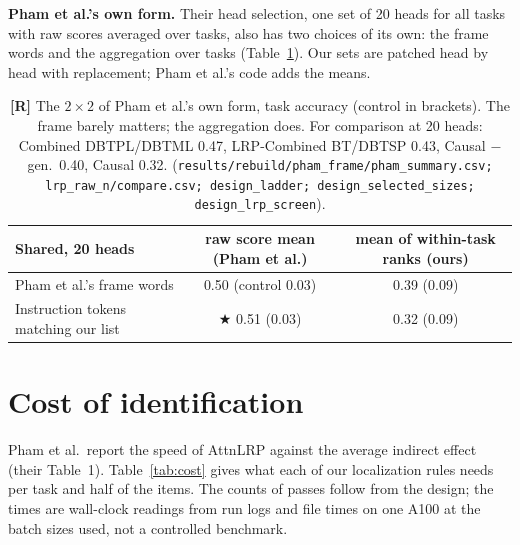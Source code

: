 \documentclass[10pt,a4paper]{article}
\newcommand{\best}{\textcolor{blue!65!black}{$\bigstar$}}
\newcommand{\tR}{\textsf{\textbf{[R]}}}
\newcommand{\src}[1]{{\footnotesize\textcolor{gray!60!black}{(\texttt{#1})}}}
\begin{document}
\textbf{Pham et al.'s own form.} Their head selection, one set of 20 heads for all tasks with raw scores averaged over tasks, also has two choices of its own: the frame words and the aggregation over tasks (Table~\ref{tab:pham}). Our sets are patched head by head with replacement; Pham et al.'s code adds the means.

\begin{table}[htbp]
\centering\small
\begin{tabular}{@{}lcc@{}}
\toprule
Shared, 20 heads & raw score mean (Pham et al.) & mean of within-task ranks (ours) \\
\midrule
Pham et al.'s frame words & 0.50 (control 0.03) & 0.39 (0.09) \\
Instruction tokens matching our list & \best{} 0.51 (0.03) & 0.32 (0.09) \\
\bottomrule
\end{tabular}
\caption{\tR{} The $2\times2$ of Pham et al.'s own form, task accuracy (control in brackets). The frame barely matters; the aggregation does. For comparison at 20 heads: Combined DBTPL/DBTML 0.47, LRP-Combined BT/DBTSP 0.43, Causal $-$ gen.\ 0.40, Causal 0.32. \src{results/rebuild/pham\_frame/pham\_summary.csv; lrp\_raw\_n/compare.csv; design\_ladder; design\_selected\_sizes; design\_lrp\_screen}.}
\label{tab:pham}
\end{table}

\section{Cost of identification}\label{sec:cost}

Pham et al.\ report the speed of AttnLRP against the average indirect effect (their Table~1). Table~\ref{tab:cost} gives what each of our localization rules needs per task and half of the items. The counts of passes follow from the design; the times are wall-clock readings from run logs and file times on one A100 at the batch sizes used, not a controlled benchmark.
\end{document}
